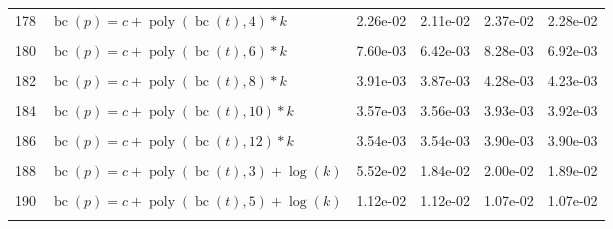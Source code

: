 \documentclass[12pt,a4paper]{article}
\DeclareMathOperator{\bc}{bc}
\DeclareMathOperator{\poly}{poly}
\begin{document}
\begin{longtable}[t]{ll>{\raggedleft\arraybackslash}p{2cm}>{\raggedleft\arraybackslash}p{2cm}>{\raggedleft\arraybackslash}p{2cm}>{\raggedleft\arraybackslash}p{2cm}}
178 & $\bc(p) = c + \poly\left( \bc(t), 4 \right) * k$ & 2.26e-02 & 2.11e-02 & 2.37e-02 & 2.28e-02\\
\cellcolor{gray!6}{179} & \cellcolor{gray!6}{$\bc(p) = c + \poly\left( \bc(t), 5 \right) * k$} & \cellcolor{gray!6}{9.50e-03} & \cellcolor{gray!6}{9.49e-03} & \cellcolor{gray!6}{9.29e-03} & \cellcolor{gray!6}{9.29e-03}\\
180 & $\bc(p) = c + \poly\left( \bc(t), 6 \right) * k$ & 7.60e-03 & 6.42e-03 & 8.28e-03 & 6.92e-03\\
\cellcolor{gray!6}{181} & \cellcolor{gray!6}{$\bc(p) = c + \poly\left( \bc(t), 7 \right) * k$} & \cellcolor{gray!6}{5.71e-03} & \cellcolor{gray!6}{4.61e-03} & \cellcolor{gray!6}{5.22e-03} & \cellcolor{gray!6}{4.96e-03}\\
182 & $\bc(p) = c + \poly\left( \bc(t), 8 \right) * k$ & 3.91e-03 & 3.87e-03 & 4.28e-03 & 4.23e-03\\
\cellcolor{gray!6}{183} & \cellcolor{gray!6}{$\bc(p) = c + \poly\left( \bc(t), 9 \right) * k$} & \cellcolor{gray!6}{3.97e-03} & \cellcolor{gray!6}{3.91e-03} & \cellcolor{gray!6}{4.36e-03} & \cellcolor{gray!6}{4.29e-03}\\
184 & $\bc(p) = c + \poly\left( \bc(t), 10 \right) * k$ & 3.57e-03 & 3.56e-03 & 3.93e-03 & 3.92e-03\\
\cellcolor{gray!6}{185} & \cellcolor{gray!6}{$\bc(p) = c + \poly\left( \bc(t), 11 \right) * k$} & \cellcolor{gray!6}{3.57e-03} & \cellcolor{gray!6}{3.56e-03} & \cellcolor{gray!6}{3.93e-03} & \cellcolor{gray!6}{3.92e-03}\\
186 & $\bc(p) = c + \poly\left( \bc(t), 12 \right) * k$ & 3.54e-03 & 3.54e-03 & 3.90e-03 & 3.90e-03\\
\cellcolor{gray!6}{187} & \cellcolor{gray!6}{$\bc(p) = c + \poly\left( \bc(t), 13 \right) * k$} & \cellcolor{gray!6}{3.54e-03} & \cellcolor{gray!6}{3.54e-03} & \cellcolor{gray!6}{3.90e-03} & \cellcolor{gray!6}{3.90e-03}\\
188 & $\bc(p) = c + \poly\left( \bc(t), 3 \right) + \log(k)$ & 5.52e-02 & 1.84e-02 & 2.00e-02 & 1.89e-02\\
\cellcolor{gray!6}{189} & \cellcolor{gray!6}{$\bc(p) = c + \poly\left( \bc(t), 4 \right) + \log(k)$} & \cellcolor{gray!6}{2.34e-02} & \cellcolor{gray!6}{2.20e-02} & \cellcolor{gray!6}{2.43e-02} & \cellcolor{gray!6}{2.35e-02}\\
190 & $\bc(p) = c + \poly\left( \bc(t), 5 \right) + \log(k)$ & 1.12e-02 & 1.12e-02 & 1.07e-02 & 1.07e-02\\
\cellcolor{gray!6}{191} & \cellcolor{gray!6}{$\bc(p) = c + \poly\left( \bc(t), 6 \right) + \log(k)$} & \cellcolor{gray!6}{9.61e-03} & \cellcolor{gray!6}{8.66e-03} & \cellcolor{gray!6}{9.86e-03} & \cellcolor{gray!6}{8.69e-03}\\

\end{longtable}
\end{document}
